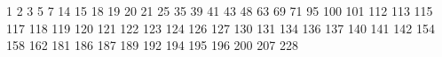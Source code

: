 1
2
3
5
7
14
15
18
19
20
21
25
35
39
41
43
48
63
69
71
95
100
101
112
113
115
117
118
119
120
121
122
123
124
126
127
130
131
134
136
137
140
141
142
154
158
162
181
186
187
189
192
194
195
196
200
207
228
